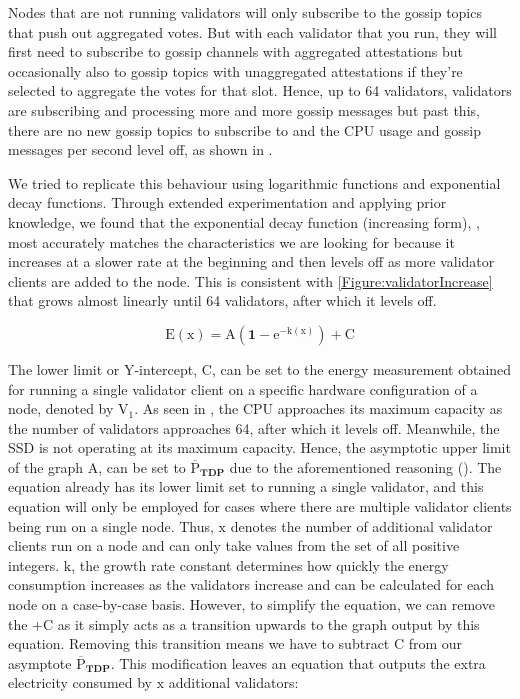 Nodes that are not running validators will only subscribe to the gossip topics that push out aggregated votes. But with each validator that you run, they will first need to subscribe to gossip channels with aggregated attestations but occasionally also to gossip topics with unaggregated attestations if they're selected to aggregate the votes for that slot. Hence, up to 64 validators, validators are subscribing and processing more and more gossip messages but past this, there are no new gossip topics to subscribe to and the CPU usage and gossip messages per second level off, as shown in .

We tried to replicate this behaviour using logarithmic functions and exponential decay functions. Through extended experimentation and applying prior knowledge, we found that the exponential decay function (increasing form), , most accurately matches the characteristics we are looking for because it increases at a slower rate at the beginning and then levels off as more validator clients are added to the node. This is consistent with \ref{Figure:validatorIncrease} that grows almost linearly until 64 validators, after which it levels off.

\begin{equation}
    \label{eqn: ExpDecayGeneral}
    \boldsymbol{\mathrm{E(\mathrm{x})} = \mathrm{A} (1-\mathrm{e}^{-\mathrm{k}(\mathrm{x})}) + \mathrm{C}}
\end{equation}

The lower limit or Y-intercept, $\boldsymbol{\mathrm{C}}$, can be set to the energy measurement obtained for running a single validator client on a specific hardware configuration of a node, denoted by $\boldsymbol{\mathrm{V_{1}}}$. As seen in , the CPU approaches its maximum capacity as the number of validators approaches 64, after which it levels off. Meanwhile, the SSD is not operating at its maximum capacity. Hence, the asymptotic upper limit of the graph $\boldsymbol{\mathrm{A}}$, can be set to $\boldsymbol{\mathrm{\overline{P}}_{TDP}}$ due to the aforementioned reasoning (). The equation already has its lower limit set to running a single validator, and this equation will only be employed for cases where there are multiple validator clients being run on a single node. Thus, $\boldsymbol{\mathrm{x}}$ denotes the number of additional validator clients run on a node and can only take values from the set of all positive integers.  $\boldsymbol{\mathrm{k}}$, the growth rate constant determines how quickly the energy consumption increases as the validators increase and can be calculated for each node on a case-by-case basis. However, to simplify the equation, we can remove the $\boldsymbol{ + \mathrm{C}}$ as it simply acts as a transition upwards to the graph output by this equation. Removing this transition means we have to subtract $\boldsymbol{ \mathrm{C}}$ from our asymptote $\boldsymbol{\mathrm{\overline{P}}_{TDP}}$. This modification leaves an equation that outputs the extra electricity consumed by $\boldsymbol{\mathrm{x}}$ additional validators:

